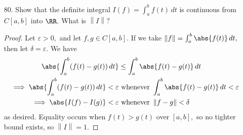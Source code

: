 \documentclass{article}
\begin{document}
\begin{itemize}
	\item[80.] Show that the definite integral $I(f)=\int_a^bf(t)\, dt$ is continuous from $C[a, b]$ into $\RR.$ What is $\left\lVert I \right\rVert?$
		\begin{proof}
			Let $\varepsilon>0,$ and let $f, g\in C[a, b].$ If we take $\left\lVert f \right\rVert=\int_a^b \abs{f(t)}\, dt,$ then let $\delta=\varepsilon.$ We have
			\begin{align*}
				\abs{\int_a^b(f(t)-g(t))\, dt} &\le \int_a^b \abs{f(t)-g(t)}\, dt \\
				\implies \abs{\int_a^b(f(t)-g(t))\, dt}<\varepsilon&\text{ whenever } \int_a^b \abs{f(t)-g(t)}\, dt < \varepsilon \\
				\implies \abs{I(f)-I(g)} < \varepsilon &\text{ whenever } \left\lVert f-g \right\rVert < \delta
			\end{align*}
			as desired. Equality occurs when $f(t)>g(t)$ over $[a, b],$ so no tighter bound exists, so $\left\lVert I \right\rVert = 1.$
		\end{proof}


\end{itemize}
\end{document}
